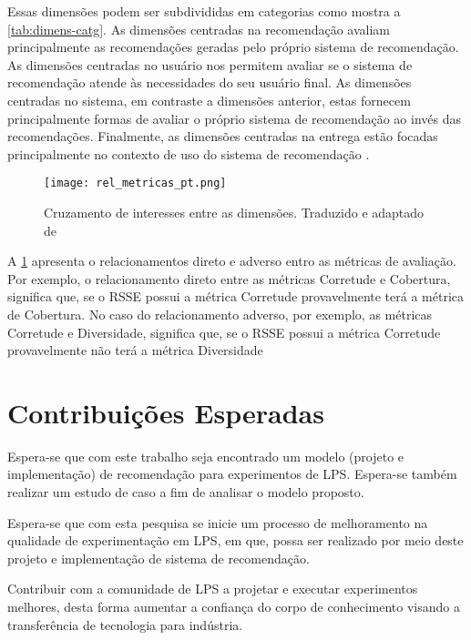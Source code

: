 Essas dimensões podem ser subdivididas em categorias como mostra a \ref{tab:dimens-catg}. As dimensões centradas na recomendação avaliam principalmente as recomendações geradas pelo próprio sistema de recomendação. As dimensões centradas no usuário nos permitem avaliar se o sistema de recomendação atende às necessidades do seu usuário final. As dimensões centradas no sistema, em contraste a dimensões anterior, estas fornecem principalmente formas de avaliar o próprio sistema de recomendação ao invés das recomendações. Finalmente, as dimensões centradas na entrega estão focadas principalmente no contexto de uso do sistema de recomendação \cite{robillard2010recommendation}.

\begin{figure}[htb]
	\centering					
	{\texttt{[image: rel\_metricas\_pt.png]}}
	
	\caption{Cruzamento de interesses entre as dimensões. Traduzido e adaptado de \citet{robillard2010recommendation}}
	\label{fig:rel_metricas}
\end{figure}

A \ref{fig:rel_metricas} apresenta o relacionamentos direto e adverso entro as métricas de avaliação. Por exemplo, o relacionamento direto entre as métricas Corretude e Cobertura, significa que, se o RSSE possui a métrica Corretude  provavelmente terá a métrica de Cobertura. No caso do relacionamento adverso, por exemplo, as métricas Corretude e Diversidade, significa que, se o RSSE possui a métrica Corretude provavelmente não terá a métrica Diversidade


\section{Contribuições Esperadas}
\label{sec:contr}

Espera-se que com este trabalho seja encontrado um modelo (projeto e implementação) de recomendação para experimentos de LPS. Espera-se também realizar um estudo de caso a fim de analisar o modelo proposto.

Espera-se que com esta pesquisa se inicie um processo de melhoramento na qualidade de experimentação em LPS, em que, possa ser realizado por meio deste projeto e implementação de sistema de recomendação.

Contribuir com a comunidade de LPS a projetar e executar experimentos melhores, desta forma aumentar a confiança do corpo de conhecimento visando a transferência de tecnologia para indústria.

